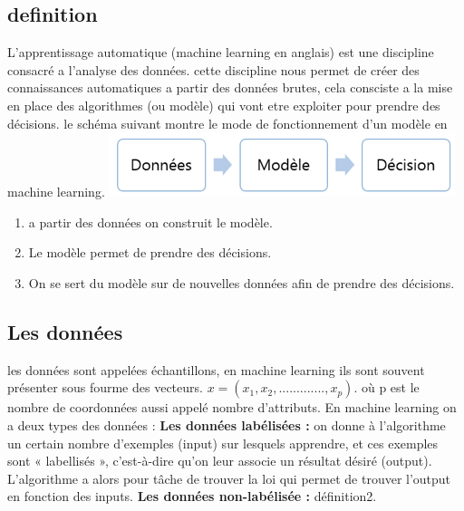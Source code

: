 \documentclass[a4paper,11pt]{report}
\begin{document}
\subsection*{definition}
L'apprentissage automatique (machine learning en anglais) est une discipline consacré a l'analyse des données. cette discipline nous permet de créer des connaissances automatiques a partir des données brutes, cela consciste a la mise en place des algorithmes (ou modèle) qui vont etre exploiter pour prendre des décisions.\newline
le schéma suivant montre le mode de fonctionnement d'un modèle en machine learning.\newline
\hspace*{4cm}\includegraphics[scale=1]{m_learning.png} 
 \begin{enumerate}
 \item a partir des données on construit le modèle.
 \item Le modèle permet de prendre des décisions.
 \item On se sert du modèle sur de nouvelles données afin de prendre des décisions.
 \end{enumerate}
\subsection{Les données}
les données sont appelées échantillons, en machine learning ils sont souvent présenter sous fourme des vecteurs.\newline
$x=(x_1, x_2,.............,x_p).$\newline
où p est le nombre de coordonnées aussi appelé nombre d’attributs.\newline
En machine learning on a deux types des données :\newline
\newline
\textbf{Les données labélisées :} on donne à l’algorithme un certain nombre d’exemples (input) sur lesquels apprendre, et ces exemples sont « labellisés », c’est-à-dire qu’on leur associe un résultat désiré (output). L’algorithme a alors pour tâche de trouver la loi qui permet de trouver l’output en fonction des inputs.\newline
\newline 
\textbf{Les données non-labélisée :} définition2.
\end{document}
